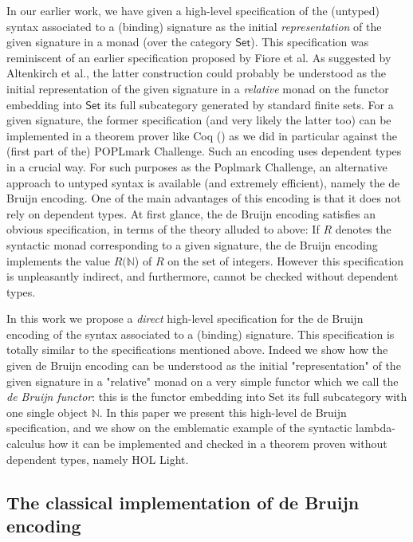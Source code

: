 \documentclass[a4paper,twoside,12pt]{article}
\theoremstyle{definition}
\theoremstyle{remark}
\theoremstyle{example}
\newcommand{\NN}{\mathbb{N}}
\begin{document}
In our earlier work, we have given a high-level specification of the
(untyped) syntax associated to a (binding) signature as the initial
\emph{representation} of the given signature in a monad (over the
category $\mathsf{Set}$). This specification was reminiscent of an
earlier specification proposed by Fiore et al. As suggested by
Altenkirch et al., the latter construction could probably be
understood as the initial representation of the given signature in a
\emph{relative} monad on the functor embedding into $\mathsf{Set}$ its
full subcategory generated by standard finite sets.  For a given
signature, the former specification (and very likely the latter too)
can be implemented in a theorem prover like Coq (\cite {todo}) as we
did in particular against the (first part of the) POPLmark Challenge.
Such an encoding uses dependent types in a crucial way.  For such
purposes as the Poplmark Challenge, an alternative approach to untyped
syntax is available (and extremely efficient), namely the de Bruijn
encoding.  One of the main advantages of this encoding is that it does
not rely on dependent types.  At first glance, the de Bruijn encoding
satisfies an obvious specification, in terms of the theory alluded to
above: If $R$ denotes the syntactic monad corresponding to a given
signature, the de Bruijn encoding implements the value $R(\NN$) of $R$
on the set of integers. However this specification is unpleasantly
indirect, and furthermore, cannot be checked without dependent types.

In this work we propose a \emph{direct} high-level specification for
the de Bruijn encoding of the syntax associated to a (binding)
signature. This specification is totally similar to the specifications
mentioned above. Indeed we show how the given de Bruijn encoding can
be understood as the initial "representation" of the given signature
in a "relative" monad on a very simple functor which we call the
\emph{de Bruijn functor}: this is the functor embedding into Set its
full subcategory with one single object $\NN$.  In this paper we
present this high-level de Bruijn specification, and we show on the
emblematic example of the syntactic lambda-calculus how it can be
implemented and checked in a theorem proven without dependent types,
namely HOL Light.

\subsection{The classical implementation of de Bruijn encoding}
\label{sec:classical-de-bruijn}
\end{document}
